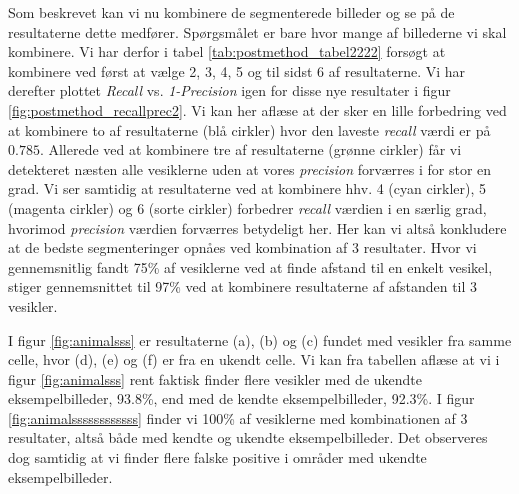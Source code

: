 Som beskrevet kan vi nu kombinere de segmenterede billeder og se på de resultaterne dette medfører. Spørgsmålet er bare hvor mange af billederne vi skal kombinere. Vi har derfor i tabel \ref{tab:postmethod_tabel2222} forsøgt at kombinere ved først at vælge 2, 3, 4, 5 og til sidst 6 af resultaterne. Vi har derefter plottet \emph{Recall} vs. \emph{1-Precision} igen for disse nye resultater i figur \ref{fig:postmethod_recallprec2}. Vi kan her aflæse at der sker en lille forbedring ved at kombinere to af resultaterne (blå cirkler) hvor den laveste \emph{recall} værdi er på $0.785$. Allerede ved at kombinere tre af resultaterne (grønne cirkler) får vi detekteret næsten alle vesiklerne uden at vores \emph{precision} forværres i for stor en grad. Vi ser samtidig at resultaterne ved at kombinere hhv. 4 (cyan cirkler), 5 (magenta cirkler) og 6 (sorte cirkler) forbedrer \emph{recall} værdien i en særlig grad, hvorimod \emph{precision} værdien forværres betydeligt her. Her kan vi altså konkludere at de bedste segmenteringer opnåes ved kombination af 3 resultater. Hvor vi gennemsnitlig fandt 75\% af vesiklerne ved at finde afstand til en enkelt vesikel, stiger gennemsnittet til 97\% ved at kombinere resultaterne af afstanden til 3 vesikler. 

I figur \ref{fig:animalsss} er resultaterne (a), (b) og (c) fundet med vesikler fra samme celle, hvor (d), (e) og (f) er fra en ukendt celle. Vi kan fra tabellen aflæse at vi i figur \ref{fig:animalsss} rent faktisk finder flere vesikler med de ukendte eksempelbilleder, 93.8\%, end med de kendte eksempelbilleder, 92.3\%. I figur \ref{fig:animalssssssssssss} finder vi 100\% af vesiklerne med kombinationen af 3 resultater, altså både med kendte og ukendte eksempelbilleder. Det observeres dog samtidig at vi finder flere falske positive i områder med ukendte eksempelbilleder. 

